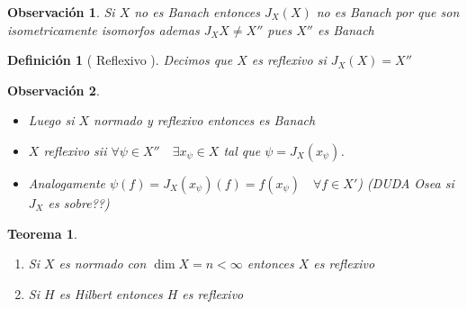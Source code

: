 \documentclass[10pt]{extarticle}
\theoremstyle{break}
\newtheorem{theorem}{Teorema}[section]
\newtheorem*{remark}{Observación}
\newtheorem{definition}{Definición}[section]
\theoremstyle{definition}
\begin{document}
\begin{remark}
Si $X$ no es Banach entonces $J_{X}(X)$ no es Banach por que son isometricamente isomorfos ademas $J_{X}X\neq X''$ pues $X''$ es Banach
\end{remark}

\begin{definition}[ Reflexivo ]
Decimos que $X$ es reflexivo si $J_{X}(X)=X''$ 
\end{definition}

\begin{remark}
	\begin{itemize}
		\item Luego si $X$ normado y reflexivo entonces es Banach
		\item $X$ reflexivo sii $\forall \psi\in X''\quad\exists x_{\psi}\in X$ tal que $\psi = J_{X}(x_{\psi})$. 
		\item Analogamente $\psi (f)=J_{X}(x_{\psi})(f)=f(x_{\psi})\quad\forall f\in X'$)
(DUDA Osea si $J_{X}$ es sobre??)

	\end{itemize}
\end{remark}



\begin{theorem}
\begin{enumerate}
\item
Si $X$ es normado con $\dim X=n<\infty$ entonces $X$ es reflexivo
\item
Si $H$ es Hilbert entonces $H$ es reflexivo
\end{enumerate}
\end{theorem}
\end{document}
